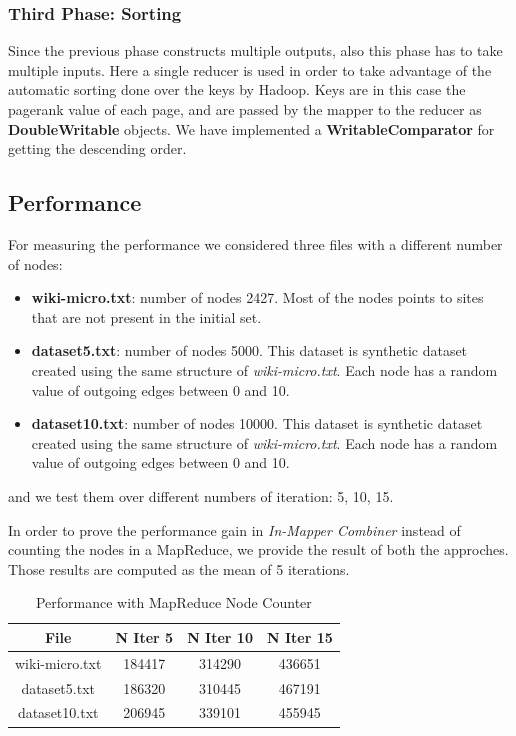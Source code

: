 \subsubsection{Third Phase: Sorting}
Since the previous phase constructs multiple outputs, also this phase has to take multiple inputs. Here a single reducer is used in order to take advantage of the automatic sorting done over the keys by Hadoop. Keys are in this case the pagerank value of each page, and are passed by the mapper to the reducer as \textbf{DoubleWritable} objects. We have implemented a \textbf{WritableComparator} for getting the descending order.

\subsection{Performance}
For measuring the performance we considered three files with a different number of nodes:
\begin{itemize}
	\item \textbf{wiki-micro.txt}: number of nodes 2427. Most of the nodes points to sites that are not present in the initial set.
	\item \textbf{dataset5.txt}: number of nodes 5000. This dataset is synthetic dataset created using the same structure of \textit{wiki-micro.txt}. Each node has a random value of outgoing edges between 0 and 10.
	\item \textbf{dataset10.txt}: number of nodes 10000. This dataset is synthetic dataset created using the same structure of \textit{wiki-micro.txt}. Each node has a random value of outgoing edges between 0 and 10.
\end{itemize}
and we test them over different numbers of iteration: 5, 10, 15.

In order to prove the performance gain in \textit{In-Mapper Combiner} instead of counting the nodes in a MapReduce, we provide the result of both the approches. Those results are computed as the mean of 5 iterations.

\begin{table}[H]
\caption{Performance with MapReduce Node Counter}
\centering
\begin{tabular}{c c c c}
\hline\hline
File & N Iter 5 & N Iter 10 & N Iter 15 \\ [0.7ex] %
\hline
wiki-micro.txt&184417&314290&436651\\
dataset5.txt&186320&310445&467191 \\
dataset10.txt&206945&339101&455945 \\ [1ex]
\hline
\end{tabular}
\label{table:nonlin}
\end{table}

